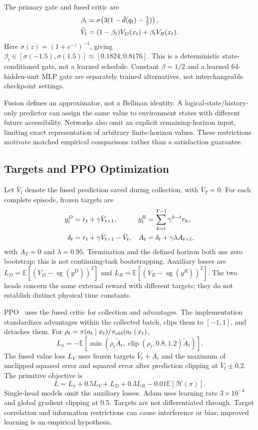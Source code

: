 \documentclass[conference]{IEEEtran}
\newcommand{\E}{\mathbb{E}}
\newcommand{\sg}{\operatorname{sg}}
\newcommand{\clip}{\operatorname{clip}}
\begin{document}
The primary gate and fused critic are
\begin{align}
\beta_t&=\sigma\!\left(3(1-\bar d(q_t)-\tfrac12)\right),\notag\\
\widehat V_t&=(1-\beta_t)V_D(x_t)+\beta_t V_R(x_t).
\label{eq:fusion}
\end{align}
Here $\sigma(z)=(1+e^{-z})^{-1}$, giving $\beta_t\in[\sigma(-1.5),\sigma(1.5)]\approx[0.1824,0.8176]$. This is a deterministic state-conditioned gate, not a learned schedule. Constant $\beta=1/2$ and a learned 64-hidden-unit MLP gate are separately trained alternatives, not interchangeable checkpoint settings.

Fusion defines an approximator, not a Bellman identity. A logical-state/history-only predictor can assign the same value to environment states with different future accessibility. Networks also omit an explicit remaining-horizon input, limiting exact representation of arbitrary finite-horizon values. These restrictions motivate matched empirical comparisons rather than a satisfaction guarantee.

\subsection{Targets and PPO Optimization}
\label{sec:optimization}
Let $\bar V_t$ denote the fused prediction saved during collection, with $\bar V_T=0$. For each complete episode, frozen targets are
\begin{align}
y_t^D&=r_t+\gamma\bar V_{t+1},&
y_t^R&=\sum_{k=t}^{T-1}\gamma^{k-t}r_k,\notag\\
\delta_t&=r_t+\gamma\bar V_{t+1}-\bar V_t,&
A_t&=\delta_t+\gamma\lambda A_{t+1},
\label{eq:targets}
\end{align}
with $A_T=0$ and $\lambda=0.95$. Termination and the defined horizon both use zero bootstrap; this is not continuing-task bootstrapping. Auxiliary losses are $L_D=\E[(V_D-\sg(y^D))^2]$ and $L_R=\E[(V_R-\sg(y^R))^2]$. The two heads concern the same external reward with different targets; they do not establish distinct physical time constants.

PPO~\citep{Schulman2017} uses the fused critic for collection and advantages. The implementation standardizes advantages within the collected batch, clips them to $[-1,1]$, and detaches them. For $\rho_t=\pi(a_t\mid x_t)/\pi_{\rm old}(a_t\mid x_t)$,
\begin{equation}
L_\pi=-\E[\min(\rho_t\widetilde A_t,
\clip(\rho_t,0.8,1.2)\widetilde A_t)].
\label{eq:ppo}
\end{equation}
The fused value loss $L_V$ uses frozen targets $\bar V_t+A_t$ and the maximum of unclipped squared error and squared error after prediction clipping at $\bar V_t\pm0.2$. The primitive objective is
\begin{equation}
L=L_\pi+0.5L_V+L_D+0.3L_R-0.01\E[\mathcal H(\pi)].
\label{eq:loss}
\end{equation}
Single-head models omit the auxiliary losses. Adam uses learning rate $3\times10^{-4}$ and global gradient clipping at 0.5. Targets are not differentiated through. Target correlation and information restrictions can cause interference or bias; improved learning is an empirical hypothesis.
\end{document}
